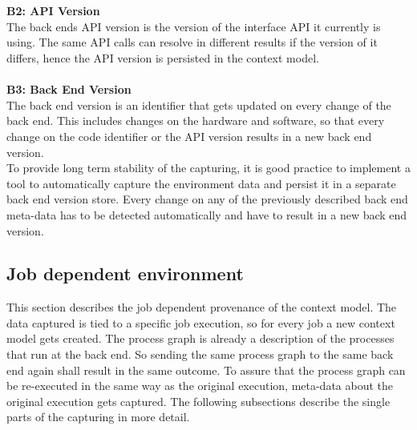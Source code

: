 \documentclass[draft,final]{vutinfth} %
\begin{document}
\\ \\
\textbf{B2: API Version} \\
The back ends API version is the version of the interface API it currently is using. The same API calls can resolve in different results if the version of it differs, hence the API version is persisted in the context model. 
\\ \\
\textbf{B3: Back End Version} \\
The back end version is an identifier that gets updated on every change of the back end. This includes changes on the hardware and software, so that every change on the code identifier or the API version results in a new back end version.   
\\
To provide long term stability of the capturing, it is good practice to implement a tool to automatically capture the environment data and persist it in a separate back end version store. Every change on any of the previously described back end meta-data has to be detected automatically and have to result in a new back end version.  


\subsection{Job dependent environment}\label{Design:Job dependent provenance}
This section describes the job dependent provenance of the context model. The data captured is tied to a specific job execution, so for every job a new context model gets created. The process graph is already a description of the processes that run at the back end. So sending the same process graph to the same back end again shall result in the same outcome. To assure that the process graph can be re-executed in the same way as the original execution, meta-data about the original execution gets captured. 
The following subsections describe the single parts of the capturing in more detail. 
\end{document}
